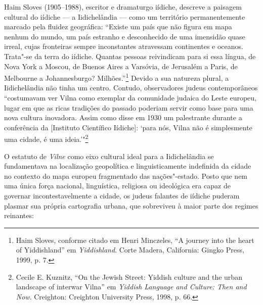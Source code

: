 Haim Sloves (1905--1988), escritor e dramaturgo iídiche, descreve a
paisagem cultural do iídiche --- a Iidichelândia --- como um território
permanentemente marcado pela fluidez geográfica: ``Existe um país que
não figura em mapa nenhum do mundo, um país estranho e desconhecido de
uma imensidão quase irreal, cujas fronteiras sempre inconstantes
atravessam continentes e oceanos. Trata"-se da terra do iídiche. Quantas
pessoas reivindicam para si essa língua, de Nova York a Moscou, de
Buenos Aires a Varsóvia, de Jerusalém a Paris, de Melbourne a
Johannesburgo? Milhões.''\footnote{Haim Sloves, conforme citado em Henri Minczeles, ``A journey into the heart of Yiddishland'' em \textit{Yiddishland}. Corte Madera, California: Gingko Press, 1999, p. 7.} Devido a sua natureza plural, a Iidichelândia não tinha um centro. Contudo, observadores
judeus contemporâneos ``costumavam ver Vilna como exemplar da comunidade
judaica do Leste europeu, lugar em que as ricas tradições do passado
poderiam servir como base para uma nova cultura inovadora. Assim como
disse em 1930 um palestrante durante a conferência da  {[}Instituto
Científico Iídiche{]}: `para nós, Vilna não é simplesmente uma cidade, é
uma ideia.'"\footnote{Cecile E. Kuznitz, ``On the Jewish Street: Yiddish culture and the urban landscape of interwar Vilna'' em \textit{Yiddish Language and Culture: Then and Now}. Creighton: Creighton University Press, 1998, p. 66.}

O estatuto de \textit{Vilne} como eixo cultural ideal para a Iidichelândia se
fundamentava na localização geopolítica e linguisticamente indefinida da
cidade no contexto do mapa europeu fragmentado das nações"-estado. Posto
que nem uma única força nacional, linguística, religiosa ou ideológica
era capaz de governar incontestavelmente a cidade, os judeus falantes de
iídiche puderam plasmar sua própria cartografia urbana, que sobreviveu à
maior parte dos regimes reinantes:

